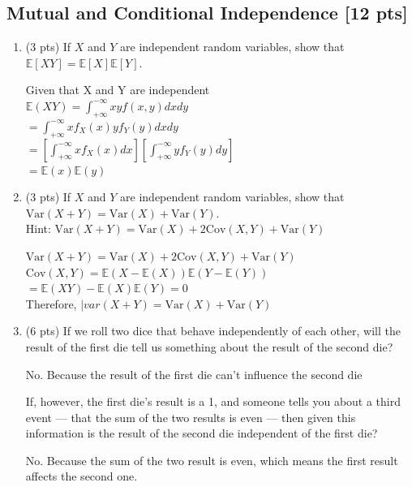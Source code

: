 \documentclass[a4paper]{article}
\theoremstyle{definition}
\newcommand{\Var}{\mathrm{Var}}
\newcommand{\Cov}{\mathrm{Cov}}
\def\E{\mathbb E}
\newenvironment{soln}{
	\leavevmode\color{blue}\ignorespaces
}{}
\begin{document}
	\subsection{Mutual and Conditional Independence [12 pts]}
	\begin{enumerate}
		\item (3 pts) If $X$ and $Y$ are independent random variables, show that
		$\mathbb{E}[XY] = \mathbb{E}[X]\mathbb{E}[Y]$.
		
		\begin{soln}  
			Given that X and Y are independent \\
			$\E(XY) = \int_{+\infty}^{-\infty} xyf(x,y)dxdy$ \\
			$= \int_{+\infty}^{-\infty} xf_{X}(x)yf_{Y}(y)dxdy$ \\
			$= [\int_{+\infty}^{-\infty} xf_{X}(x)dx][\int_{+\infty}^{-\infty} yf_{Y}(y)dy]$ \\
			$= \E(x)\E(y)$ \\
		\end{soln}
		
		\item (3 pts) If $X$ and $Y$ are independent random variables, show that
		$\Var(X+Y) = \Var(X) + \Var(Y)$. \\
		Hint: $\Var(X+Y) = \Var(X) + 2\Cov(X, Y) + \Var(Y)$
		
		\begin{soln} 
			$\Var(X+Y) = \Var(X) + 2\Cov(X, Y) + \Var(Y)$ \\
			$\Cov(X,Y) = \E(X - \E(X))\E(Y - \E(Y))$ \\
			$= \E(XY) - \E(X)\E(Y) = 0$ \\
			Therefore, $|var(X+Y) = \Var(X) + \Var(Y)$ \\
		\end{soln}
		
		\item (6 pts) If we roll two dice that behave independently of each
		other, will the result of the first die tell us something about the
		result of the second die? 
		
		\begin{soln}  No. Because the result of the first die can't influence the second die \end{soln}
		
		If, however, the first die's result is a 1,
		and someone tells you about a third event --- that the sum of the two
		results is even --- then given this information is the result of the second die
		independent of the first die? 
		
		\begin{soln}
			No. Because the sum of the two result is even, which means the first result affects the second one. 
		\end{soln}
	\end{enumerate}
	
\end{document}
